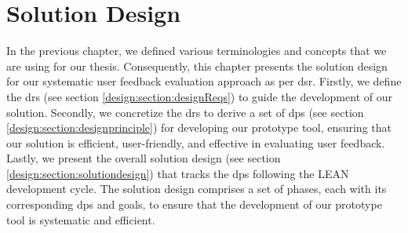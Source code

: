 
\chapter{Solution Design}
\label{chap:design}

\ifpdf
    \graphicspath{{Chapters/Design/Figs/}{Chapters/Design/Figs/}{Chapters/Design/Figs/}}
\else
    \graphicspath{{Chapters/Design/Figs/}{Chapters/Design/Figs/}}
\fi
In the previous chapter, we defined various terminologies and concepts that we are using for our thesis.
Consequently, this chapter presents the solution design for our systematic user feedback evaluation approach as per \ac{dsr}.
Firstly, we define the \ac{dr}s (see section \ref{design:section:designReqs}) to guide the development of our solution.
Secondly, we concretize the \ac{dr}s to derive a set of \ac{dp}s (see section \ref{design:section:designprinciple}) for developing our prototype tool, ensuring that our solution is efficient, user-friendly, and effective in evaluating user feedback.
Lastly, we present the overall solution design (see section \ref{design:section:solutiondesign}) that tracks the \ac{dp}s following the LEAN development cycle. 
The solution design comprises a set of phases, each with its corresponding \ac{dp}s and goals, to ensure that the development of our prototype tool is systematic and efficient.


